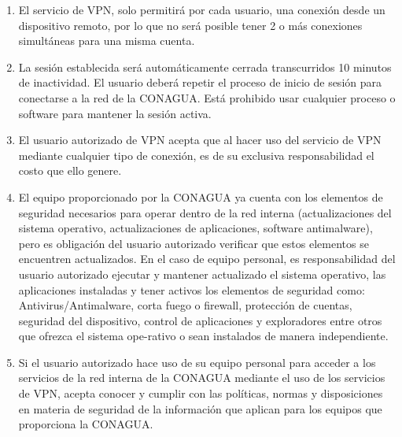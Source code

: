 \documentclass[letterpaper,11pt]{article}
\begin{document}
{\begin{enumerate}
              definidas en su configuración para acceder a otros recursos de red.
	\item El servicio de VPN, solo permitirá por cada usuario, una conexión desde un dispositivo remoto,
               por lo que no será posible tener 2 o más conexiones simultáneas para una misma cuenta.
	\item  La sesión establecida será automáticamente cerrada transcurridos 10 minutos de inactividad. 
              El usuario deberá repetir el proceso de inicio de sesión para conectarse a la red de la CONAGUA. 
              Está prohibido usar cualquier proceso o software para mantener la sesión activa.
	\item El usuario autorizado de VPN acepta que al hacer uso del servicio de VPN mediante cualquier 
              tipo de conexión, es de su exclusiva responsabilidad el costo que ello genere.
	\item El equipo proporcionado por la CONAGUA ya cuenta con los elementos de seguridad necesarios para 
              operar dentro de la red interna (actualizaciones del sistema operativo, actualizaciones de aplicaciones, 
              software antimalware), pero es obligación del usuario autorizado verificar que estos elementos se encuentren 
              actualizados. En el caso de equipo personal, es responsabilidad del usuario autorizado ejecutar y mantener 
              actualizado el sistema operativo, las aplicaciones instaladas y tener activos los elementos de seguridad como: 
              Antivirus/Antimalware, corta fuego o firewall, protección de cuentas, seguridad del dispositivo, control de 
              aplicaciones y exploradores entre otros que ofrezca el sistema ope-rativo o sean instalados de manera 				independiente.
	\item Si el usuario autorizado hace uso de su equipo personal para acceder a los servicios de la red interna de 
              la CONAGUA mediante el uso de los servicios de VPN, acepta conocer y cumplir con las políticas, normas y disposiciones en materia de seguridad de la información que aplican para los equipos que proporciona la CONAGUA.
\end{enumerate}}
\end{document}
